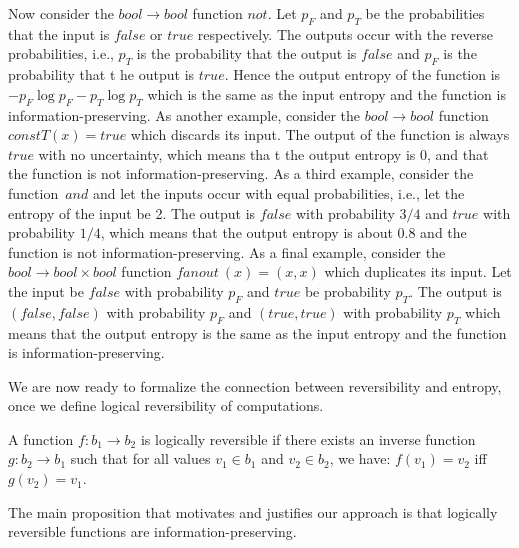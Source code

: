  Now consider the \ensuremath{\mathit{bool} \rightarrow \mathit{bool}}
function \ensuremath{\mathit{not}}. Let $p_F$ and $p_T$ be the
probabilities that the input is \ensuremath{\mathit{false}} or
\ensuremath{\mathit{true}} respectively. The outputs occur with the
reverse probabilities, i.e., $p_T$ is the probability that the output
is \ensuremath{\mathit{false}} and $p_F$ is the probability that t he
output is \ensuremath{\mathit{true}}. Hence the output entropy of the
function is $- p_F \log{p_F} - p_T \log{p_T}$ which is the same as the
input entropy and the function is information-preserving. As another
example, consider the \ensuremath{\mathit{bool} \rightarrow
  \mathit{bool}} function \ensuremath{\mathit{constT}(x) =
  \mathit{true}} which discards its input.  The output of the function
is always \ensuremath{\mathit{true}} with no uncertainty, which means
tha t the output entropy is 0, and that the function is not
information-preserving. As a third example, consider the
function~\ensuremath{\mathit{and}} and let the inputs occur with equal
probabilities, i.e., let the entropy of the input be 2. The output is
\ensuremath{\mathit{false}} with probability $3/4$ and
\ensuremath{\mathit{true}} with probability $1/4$, which means that
the output entropy is about 0.8 and the function is not
information-preserving. As a final example, consider the
\ensuremath{\mathit{bool} \rightarrow \mathit{bool}\times
  \mathit{bool}} function \ensuremath{\mathit{fanout} ~(x) = (x,x)}
which duplicates its input.  Let the input be
\ensuremath{\mathit{false}} with probability $p_F$ and
\ensuremath{\mathit{true}} be probability $p_T$. The output is
\ensuremath{(\mathit{false},\mathit{false})} with probability $p_F$
and \ensuremath{(\mathit{true},\mathit{true})} with probability $p_T$
which means that the output entropy is the same as the input entropy
and the function is information-preserving.

We are now ready to formalize the connection between reversibility and
entropy, once we define logical reversibility of computations. 

\begin{definition}
A function $f : b_1 \rightarrow b_2$ is logically reversible if there exists
an inverse function $g : b_2 \rightarrow b_1$ such that for all values $v_1
\in b_1$ and $v_2 \in b_2$, we have: $f(v_1) = v_2$ iff $g(v_2) = v_1$.
\end{definition}

\noindent The main proposition that motivates and justifies our approach is that
logically reversible functions are information-preserving.

